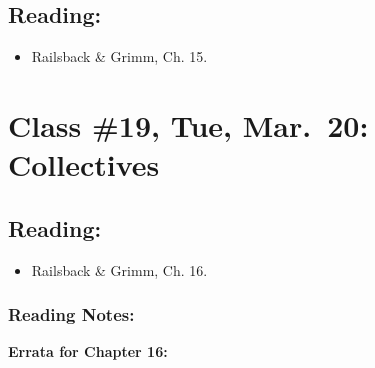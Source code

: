 \documentclass[]{article}
\providecommand{\tightlist}{%
  \setlength{\itemsep}{0pt}\setlength{\parskip}{0pt}}
\begin{document}
\hypertarget{reading-17}{%
\subsection{Reading:}\label{reading-17}}

\begin{itemize}
\tightlist
\item
  Railsback \& Grimm, Ch. 15.
\end{itemize}

\hypertarget{class-19-tue-mar.20-collectives}{%
\section{Class \#19, Tue, Mar.~20:
Collectives}\label{class-19-tue-mar.20-collectives}}

\hypertarget{reading-18}{%
\subsection{Reading:}\label{reading-18}}

\begin{itemize}
\tightlist
\item
  Railsback \& Grimm, Ch. 16.
\end{itemize}

\hypertarget{reading-notes-14}{%
\subsubsection{Reading Notes:}\label{reading-notes-14}}

\textbf{Errata for Chapter 16:}
\end{document}
